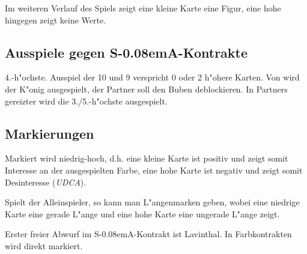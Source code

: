 \documentclass[11pt,german,twocolumn,twoside]{scrartcl}
\def\sa{\nobreak\textsf{S\kern-0.08emA}\xspace}
\newcommand{\conv}[1]{\emph{#1}}
\begin{document}
Im weiteren Verlauf des Spiels zeigt eine kleine Karte eine
Figur, eine hohe hingegen zeigt keine Werte.

\subsection{Ausspiele gegen \sa-Kontrakte}

4.-h"ochste. Ausspiel der 10 und 9 verspricht 0 oder 2 h"ohere Karten. Von
 wird der K"onig ausgespielt, der Partner soll den Buben deblockieren. In
Partners gereizter wird die 3./5.-h"ochste ausgespielt.

\subsection{Markierungen}

Markiert wird niedrig-hoch, d.h. eine kleine Karte ist positiv und zeigt somit
Interesse an der ausgespielten Farbe, eine hohe Karte ist negativ und zeigt
somit Desinteresse (\conv{UDCA}).

Spielt der Alleinspieler, so kann man L"angenmarken geben, wobei eine niedrige
Karte eine gerade L"ange und eine hohe Karte eine ungerade L"ange zeigt.

Erster freier Abwurf im \sa-Kontrakt ist Lavinthal. In Farbkontrakten wird
direkt markiert.
\raggedbottom
\end{document}

